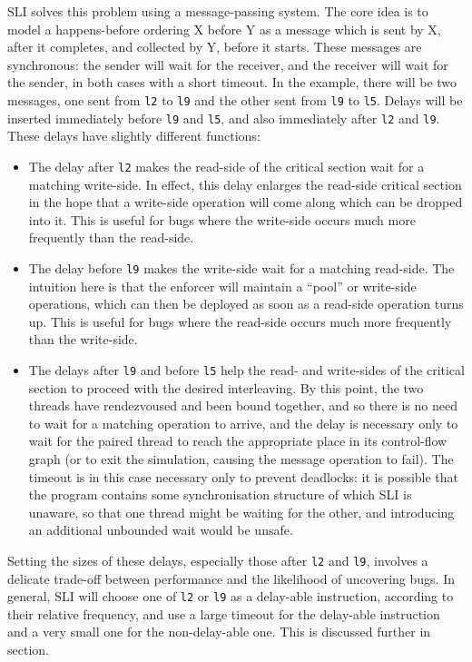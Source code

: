 SLI solves this problem using a message-passing system.
The core idea is to model a happens-before ordering X before Y as a message which is sent by X, after it completes, and collected by Y, before it starts.
These messages are synchronous: the sender will wait for the receiver, and the receiver will wait for the sender, in both cases with a short timeout.
In the example, there will be two messages, one sent from \verb|l2| to \verb|l9| and the other sent from \verb|l9| to \verb|l5|.
Delays will be inserted immediately before \verb|l9| and \verb|l5|, and also immediately after \verb|l2| and \verb|l9|.
These delays have slightly different functions:

\begin{itemize}
\item
  The delay after \verb|l2| makes the read-side of the critical section wait for a matching write-side.
  In effect, this delay enlarges the read-side critical section in the hope that a write-side operation will come along which can be dropped into it.
  This is useful for bugs where the write-side occurs much more frequently than the read-side.
\item
  The delay before \verb|l9| makes the write-side wait for a matching read-side.
  The intuition here is that the enforcer will maintain a ``pool'' or write-side operations, which can then be deployed as soon as a read-side operation turns up.
  This is useful for bugs where the read-side occurs much more frequently than the write-side.
\item
  The delays after \verb|l9| and before \verb|l5| help the read- and write-sides of the critical section to proceed with the desired interleaving.
  By this point, the two threads have rendezvoused and been bound together, and so there is no need to wait for a matching operation to arrive, and the delay is necessary only to wait for the paired thread to reach the appropriate place in its control-flow graph (or to exit the simulation, causing the message operation to fail).
  The timeout is in this case necessary only to prevent deadlocks: it is possible that the program contains some synchronisation structure of which SLI is unaware, so that one thread might be waiting for the other, and introducing an additional unbounded wait would be unsafe.
\end{itemize}

Setting the sizes of these delays, especially those after \verb|l2| and \verb|l9|, involves a delicate trade-off between performance and the likelihood of uncovering bugs.
In general, SLI will choose one of \verb|l2| or \verb|l9| as a delay-able instruction, according to their relative frequency, and use a large timeout for the delay-able instruction and a very small one for the non-delay-able one.
This is discussed further in section\needCite{}.

